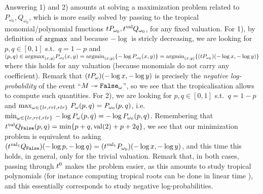 Answering 1) and 2) amounts at solving a maximization problem related to $P_{\omega_0}, Q_{\omega_0}$, which is more easily solved by 
passing to the tropical monomial/polynomial functions $\trop P_{\omega_0},\trop^{\mathrm{val}} Q_{\omega_0}$, for any fixed valuation.
For 1), by definition of $\mathrm{arg max}$ and because $-\log$ is stricly decreasing, we are looking for $p,q\in[0,1]$ s.t.\ $q=1-p$ and $(p,q)\in
   \RM{arg max}_{(x,y)} P_{\omega_0} (x,y)
   = %
   \RM{arg min}_{(x,y)}\set{-\log P_{\omega_0} (x,y)}
   =%
   \RM{arg min}_{(x,y)}\set{(\trop P_{\omega_0}) (-\log x,-\log y)} \label{eq:argmax}$
where this holds for any valuation (because monomials do not carry any coefficient).
Remark that $(\trop P_{\omega})( -\log x, -\log y)$ is precisely the \emph{negative log-probability} of the event ``$M\twoheadrightarrow \mathtt{False}_{\omega}$'', so we see that the tropicalisation allows to compute such quantities.
For 2), %
we are looking for $p,q\in[0,1]$ s.t.\ $q=1-p$ and
$\max_{\omega\in\{lr,rrl,rlr\}} \, P_\omega(p,q) = P_{\omega_0}(p,q)$, i.e.\ $\min_{\omega\in\{lr,rrl,rlr\}} \, -\log P_\omega(p,q) = -\log P_{\omega_0}(p,q)$.
Remembering that $\trop^{\mathrm{val}} Q_{\false}(p,q)=\min\set{p+q, \mathrm{val}(2)+p+2q}$, we see that our minimization problem is equivalent to asking $(\trop^{\mathrm{val}_1} Q_{\false})( -\log p, -\log q) = (\trop^{\mathrm{val}_1} P_{\omega_0})( -\log x, -\log y)\label{eq:max}$,
and this time this holds, in general, only for the trivial valuation.
Remark that, in both cases, passing through $\trop^0 $ %
makes the problem easier, as this amounts to study tropical polynomials (for instance computing tropical roots can be done in linear time \cite{Noferini2lr5}), and this essentially corresponds to study negative log-probabilities. %


